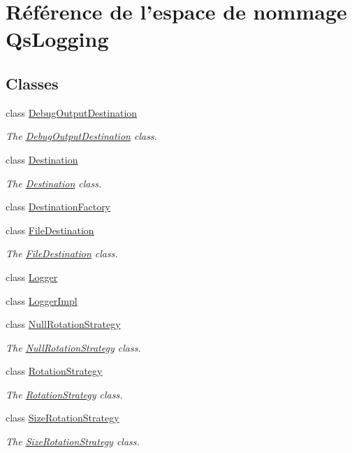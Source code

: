 \hypertarget{namespaceQsLogging}{\section{Référence de l'espace de nommage Qs\-Logging}
\label{namespaceQsLogging}
}
\subsection*{Classes}
\begin{DoxyCompactItemize}
\item 
class \hyperlink{classQsLogging_1_1DebugOutputDestination}{Debug\-Output\-Destination}
\begin{DoxyCompactList}\small\item\em The \hyperlink{classQsLogging_1_1DebugOutputDestination}{Debug\-Output\-Destination} class. \end{DoxyCompactList}\item 
class \hyperlink{classQsLogging_1_1Destination}{Destination}
\begin{DoxyCompactList}\small\item\em The \hyperlink{classQsLogging_1_1Destination}{Destination} class. \end{DoxyCompactList}\item 
class \hyperlink{classQsLogging_1_1DestinationFactory}{Destination\-Factory}
\item 
class \hyperlink{classQsLogging_1_1FileDestination}{File\-Destination}
\begin{DoxyCompactList}\small\item\em The \hyperlink{classQsLogging_1_1FileDestination}{File\-Destination} class. \end{DoxyCompactList}\item 
class \hyperlink{classQsLogging_1_1Logger}{Logger}
\item 
class \hyperlink{classQsLogging_1_1LoggerImpl}{Logger\-Impl}
\item 
class \hyperlink{classQsLogging_1_1NullRotationStrategy}{Null\-Rotation\-Strategy}
\begin{DoxyCompactList}\small\item\em The \hyperlink{classQsLogging_1_1NullRotationStrategy}{Null\-Rotation\-Strategy} class. \end{DoxyCompactList}\item 
class \hyperlink{classQsLogging_1_1RotationStrategy}{Rotation\-Strategy}
\begin{DoxyCompactList}\small\item\em The \hyperlink{classQsLogging_1_1RotationStrategy}{Rotation\-Strategy} class. \end{DoxyCompactList}\item 
class \hyperlink{classQsLogging_1_1SizeRotationStrategy}{Size\-Rotation\-Strategy}
\begin{DoxyCompactList}\small\item\em The \hyperlink{classQsLogging_1_1SizeRotationStrategy}{Size\-Rotation\-Strategy} class. \end{DoxyCompactList}\end{DoxyCompactItemize}
